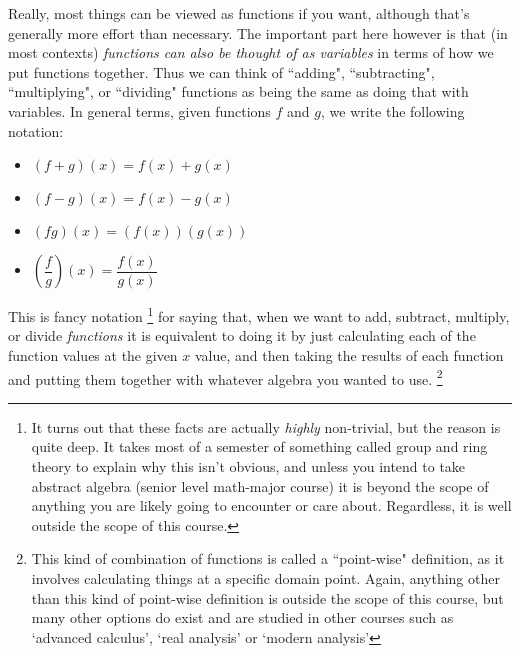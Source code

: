\documentclass{ximeraXloud}
\begin{document}
Really, most things can be viewed as functions if you want, although that's generally more effort than necessary. The important part here however is that (in most contexts) \textit{functions can also be thought of as variables} in terms of how we put functions together. Thus we can think of ``adding", ``subtracting", ``multiplying", or ``dividing" functions as being the same as doing that with variables. In general terms, given functions $f$ and $g$, we write the following notation:

\begin{itemize}
    \item $(f + g)(x)  = f(x) + g(x)$
    \item $(f - g)(x) = f(x) - g(x)$
    \item $(fg)(x) = (f(x))(g(x))$
    \item $\left(\dfrac{f}{g}\right)(x) = \dfrac{f(x)}{g(x)}$
\end{itemize}

This is fancy notation%
\footnote{%
    It turns out that these facts are actually \textit{highly} non-trivial, but the reason is quite deep. It takes most of a semester of something called group and ring theory to explain why this isn't obvious, and unless you intend to take abstract algebra (senior level math-major course) it is beyond the scope of anything you are likely going to encounter or care about. Regardless, it is well outside the scope of this course.%
    }
for saying that, when we want to add, subtract, multiply, or divide \textit{functions} it is equivalent to doing it by just calculating each of the function values at the given $x$ value, and then taking the results of each function and putting them together with whatever algebra you wanted to use.%
\footnote{%
    This kind of combination of functions is called a ``point-wise" definition, as it involves calculating things at a specific domain point. Again, anything other than this kind of point-wise definition is outside the scope of this course, but many other options do exist and are studied in other courses such as `advanced calculus', `real analysis' or `modern analysis'%
    }
\end{document}
